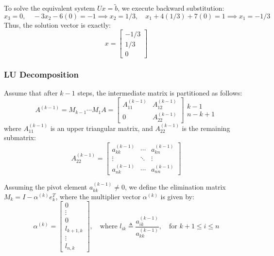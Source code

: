 \documentclass[12pt, a4paper]{article}
\theoremstyle{break}
\begin{document}
To solve the equivalent system $Ux = \tilde{b}$, we execute backward substitution:
\[
x_3 = 0, \quad -3x_2 - 6(0) = -1 \implies x_2 = 1/3, \quad x_1 + 4(1/3) + 7(0) = 1 \implies x_1 = -1/3
\]
Thus, the solution vector is exactly:
\[
x = \begin{bmatrix} -1/3 \\ 1/3 \\ 0 \end{bmatrix}
\]


\subsubsection{LU Decomposition}
Assume that after $k-1$ steps, the intermediate matrix is partitioned as follows:
\begin{equation*}
    A^{(k-1)} = M_{k-1} \cdots M_1 A = \left[ \begin{array}{c|c} A_{11}^{(k-1)} & A_{12}^{(k-1)} \\ \hline 0 & A_{22}^{(k-1)} \end{array} \right] \begin{array}{l} k-1 \\ n-k+1 \end{array}
\end{equation*}
where $A_{11}^{(k-1)}$ is an upper triangular matrix, and $A_{22}^{(k-1)}$ is the remaining submatrix:
\begin{equation*}
    A_{22}^{(k-1)} = \begin{bmatrix} a_{kk}^{(k-1)} & \cdots & a_{kn}^{(k-1)} \\ \vdots & \ddots & \vdots \\ a_{nk}^{(k-1)} & \cdots & a_{nn}^{(k-1)} \end{bmatrix}
\end{equation*}

Assuming the pivot element $a_{kk}^{(k-1)} \neq 0$, we define the elimination matrix $M_k = I - \alpha^{(k)} e_k^T$, where the multiplier vector $\alpha^{(k)}$ is given by:
\begin{equation*}
    \alpha^{(k)} = \begin{bmatrix} 0 \\ \vdots \\ 0 \\ l_{k+1,k} \\ \vdots 
\\ l_{n,k} \end{bmatrix}, \quad \text{where } l_{ik} \triangleq \frac{a_{ik}^{(k-1)}}{a_{kk}^{(k-1)}}, \quad \text{for } k+1 \le i \le n
\end{equation*}
\end{document}
